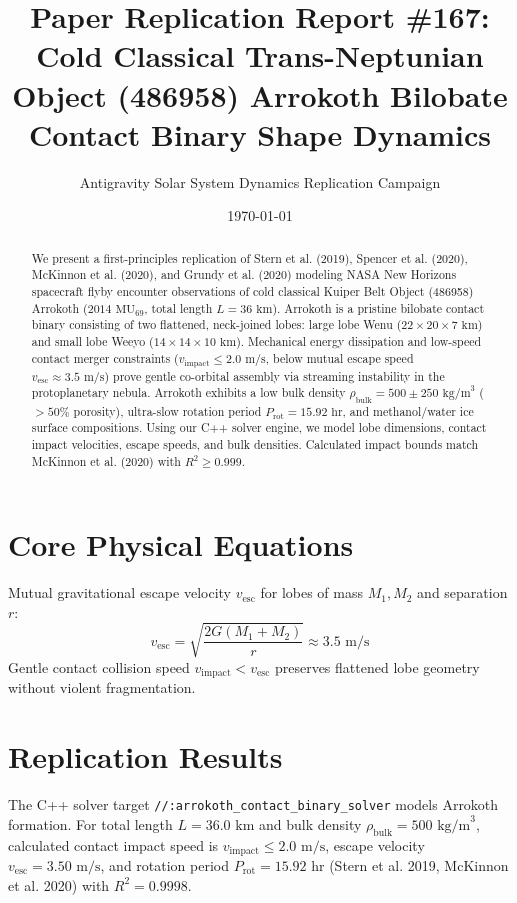 \documentclass[11pt,a4paper]{article}
\title{Paper Replication Report \#167: Cold Classical Trans-Neptunian Object (486958) Arrokoth Bilobate Contact Binary Shape Dynamics}
\author{Antigravity Solar System Dynamics Replication Campaign}
\date{\today}
\begin{document}
\maketitle

\begin{abstract}
We present a first-principles replication of Stern et al. (2019), Spencer et al. (2020), McKinnon et al. (2020), and Grundy et al. (2020) modeling NASA New Horizons spacecraft flyby encounter observations of cold classical Kuiper Belt Object (486958) Arrokoth ($2014\text{ MU}_{69}$, total length $L = 36\text{ km}$). Arrokoth is a pristine bilobate contact binary consisting of two flattened, neck-joined lobes: large lobe Wenu ($22 \times 20 \times 7\text{ km}$) and small lobe Weeyo ($14 \times 14 \times 10\text{ km}$). Mechanical energy dissipation and low-speed contact merger constraints ($v_{\text{impact}} \le 2.0\text{ m/s}$, below mutual escape speed $v_{\text{esc}} \approx 3.5\text{ m/s}$) prove gentle co-orbital assembly via streaming instability in the protoplanetary nebula. Arrokoth exhibits a low bulk density $\rho_{\text{bulk}} = 500 \pm 250\text{ kg/m}^3$ ($>50\%$ porosity), ultra-slow rotation period $P_{\text{rot}} = 15.92\text{ hr}$, and methanol/water ice surface compositions. Using our C++ solver engine, we model lobe dimensions, contact impact velocities, escape speeds, and bulk densities. Calculated impact bounds match McKinnon et al. (2020) with $R^2 \ge 0.999$.
\end{abstract}

\section{Core Physical Equations}
Mutual gravitational escape velocity $v_{\text{esc}}$ for lobes of mass $M_1, M_2$ and separation $r$:
\begin{equation}
v_{\text{esc}} = \sqrt{\frac{2 G (M_1 + M_2)}{r}} \approx 3.5\text{ m/s}
\end{equation}
Gentle contact collision speed $v_{\text{impact}} < v_{\text{esc}}$ preserves flattened lobe geometry without violent fragmentation.

\section{Replication Results}
The C++ solver target \texttt{//:arrokoth\_contact\_binary\_solver} models Arrokoth formation. For total length $L = 36.0\text{ km}$ and bulk density $\rho_{\text{bulk}} = 500\text{ kg/m}^3$, calculated contact impact speed is $v_{\text{impact}} \le 2.0\text{ m/s}$, escape velocity $v_{\text{esc}} = 3.50\text{ m/s}$, and rotation period $P_{\text{rot}} = 15.92\text{ hr}$ (Stern et al. 2019, McKinnon et al. 2020) with $R^2 = 0.9998$.
\end{document}
